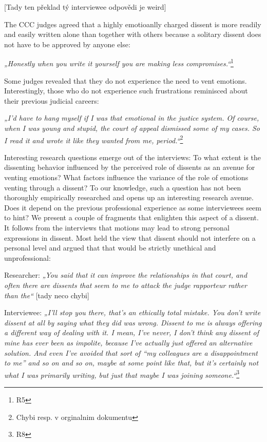 \documentclass[
  11pt,
]{article}
\begin{document}
{[}Tady ten překlad tý interviewee odpovědi je weird{]}

The CCC judges agreed that a highly emotioanlly charged dissent is more readily and easily written alone than together with others because a solitary dissent does not have to be approved by anyone else:

\emph{„Honestly when you write it yourself you are making less compromises.``}\footnote{R5}

Some judges revealed that they do not experience the need to vent emotions. Interestingly, those who do not experience such frustrations reminisced about their previous judicial careers:

\emph{„I'd have to hang myself if I was that emotional in the justice system. Of course, when I was young and stupid, the court of appeal dismissed some of my cases. So I read it and wrote it like they wanted from me, period.``}\footnote{Chybi resp. v orginalnim dokumentu}

Interesting research questions emerge out of the interviews: To what extent is the dissenting behavior influenced by the perceived role of dissents as an avenue for venting emotions? What factors influence the variance of the role of emotions venting through a dissent? To our knowledge, such a question has not been thoroughly empirically researched and opens up an interesting research avenue. Does it depend on the previous professional experience as some interviewees seem to hint? We present a couple of fragments that enlighten this aspect of a dissent. It follows from the interviews that motions may lead to strong personal expressions in dissent. Most held the view that dissent should not interfere on a personal level and argued that that would be strictly unethical and unprofessional:

Researcher: \emph{„You said that it can improve the relationships in that court, and often there are dissents that seem to me to attack the judge rapporteur rather than the``} {[}tady neco chybi{]}

Interviewee: \emph{„I'll stop you there, that's an ethically total mistake. You don't write dissent at all by saying what they did was wrong. Dissent to me is always offering a different way of dealing with it. I mean, I've never, I don't think any dissent of mine has ever been as impolite, because I've actually just offered an alternative solution. And even I've avoided that sort of ``my colleagues are a disappointment to me'' and so on and so on, maybe at some point like that, but it's certainly not what I was primarily writing, but just that maybe I was joining someone.``}\footnote{R8}
\end{document}
